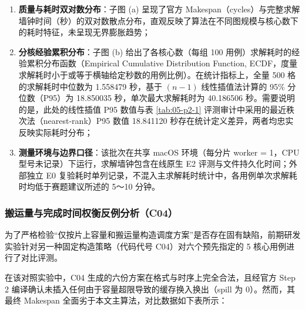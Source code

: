 \documentclass[anonymous,withtoc]{gmcm2026}
\providecommand{\tightlist}{\setlength{\itemsep}{0pt}\setlength{\parskip}{0pt}}
\begin{document}
\begin{enumerate}
\def\labelenumi{\arabic{enumi}.}
\tightlist
\item
  \textbf{质量与耗时双对数分布}：子图 (a) 呈现了官方 Makespan（cycles）与完整求解墙钟时间（秒）的双对数散点分布，直观反映了算法在不同图规模与核心数下的耗时特征，未呈现无界膨胀趋势；
\item
  \textbf{分核经验累积分布}：子图 (b) 给出了各核心数（每组 100 用例）求解耗时的经验累积分布函数（Empirical Cumulative Distribution Function, ECDF，度量求解耗时小于或等于横轴给定秒数的用例比例）。在统计指标上，全量 500 格的求解耗时中位数为 1.558479 秒，基于 \((n-1)\) 线性插值法计算的 95\% 分位数（P95）为 18.850035 秒，单次最大求解耗时为 40.186506 秒。需要说明的是，此处的线性插值 P95 数值与表 \ref{tab:05-p2-1} 评测审计中采用的最近秩次法（nearest-rank）P95 数值 18.841120 秒存在统计定义差异，两者均忠实反映实际耗时分布；
\item
  \textbf{测量环境与边界口径}：该批次在共享 macOS 环境（每分片 worker = 1，CPU 型号未记录）下运行，求解墙钟包含在线原生 E2 评测与文件持久化时间；外部独立 E0 复验耗时单列记录，不混入主求解耗时统计中，各用例单次求解耗时均低于赛题建议所述的 5～10 分钟。
\end{enumerate}

\subsubsection{搬运量与完成时间权衡反例分析（C04）}

为了严格检验``仅按片上容量和搬运量构造调度方案''是否存在固有缺陷，前期研发实验针对另一种固定构造策略（代码代号 C04）对六个预先指定的 5 核心用例进行了对比评测。

在该对照实验中，C04 生成的六份方案在格式与时序上完全合法，且经官方 Step 2 编译确认未插入任何由于容量超限导致的缓存换入换出（spill 为 0）。然而，其最终 Makespan 全面劣于本文主算法，对比数据如下表所示：
\end{document}
